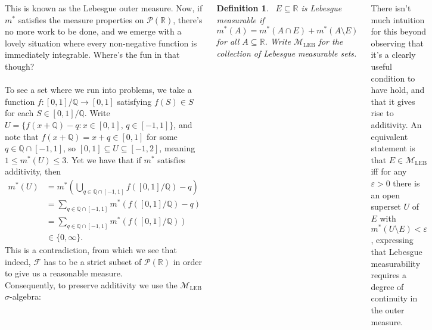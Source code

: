 \documentclass{tikzposter} %
\newtheorem{definition}{Definition}
\begin{document}
\begin{columns}
{{  This is known as the Lebesgue outer measure. Now, if $m^{*}$ satisfies the measure properties on $\mathcal{P}(\mathbb{R})$, there's no more work to be done, and we emerge with a lovely situation where every non-negative function is immediately integrable. Where's the fun in that though? \\

  \\

  To see a set where we run into problems, we take a function $f : [0,1] / \mathbb{Q} \to [0,1]$ satisfying $f(S) \in S$ for each $S \in [0,1] / \mathbb{Q}$. Write $U = \{f(x + \mathbb{Q}) - q : x \in [0,1],\, q \in [-1,1]\}$, and note that $f(x+\mathbb{Q}) = x + q \in [0,1]$ for some $q \in \mathbb{Q} \cap [-1,1]$, so $[0,1] \subseteq U \subseteq [-1,2]$, meaning $1 \le m^{*}(U) \le 3$. Yet we have that if $m^{*}$ satisfies additivity, then \\
  \begin{align*}
    m^{*}(U) &= m^{*}\left(\bigcup_{q \in \mathbb{Q} \cap [-1,1]} f([0,1]/\mathbb{Q}) - q\right) \\
             &= \sum_{q \in \mathbb{Q} \cap [-1,1]} m^{*}(f([0,1]/\mathbb{Q})-q) \\
             &= \sum_{q \in \mathbb{Q} \cap [-1,1]} m^{*}(f([0,1]/\mathbb{Q})) \\
    &\in \{0,\infty\}.
  \end{align*}
  This is a contradiction, from which we see that indeed, $\mathcal{F}$ has to be a strict subset of $\mathcal{P}(\mathbb{R})$ in order to give us a reasonable measure. \\

  Consequently, to preserve additivity we use the $\mathcal{M}_{\mathrm{LEB}}$ $\sigma$-algebra: \\

 \begin{definition}
    \ $E \subseteq \mathbb{R}$ is Lebesgue measurable if
    \[
      m^{*}(A) = m^{*}(A \cap E) + m^{*}(A \setminus E)
    \]
    for all $A \subseteq \mathbb{R}$. Write $\mathcal{M}_{\mathrm{LEB}}$ for the collection of Lebesgue measurable sets.
  \end{definition}
  \hphantom{}

  There isn't much intuition for this beyond observing that it's a clearly useful condition to have hold, and that it gives rise to additivity. An equivalent statement is that $E \in \mathcal{M}_{\mathrm{LEB}}$ iff for any $\varepsilon > 0$ there is an open superset $U$ of $E$ with $m^{*}(U \setminus E) < \varepsilon$, expressing that Lebesgue measurability requires a degree of continuity in the outer measure. \\

}}
\end{columns}
\end{document}
